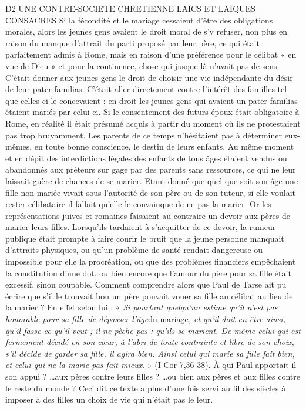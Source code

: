 D2 UNE CONTRE-SOCIETE CHRETIENNE
LAÏCS ET LAÏQUES CONSACRES
 Si la fécondité et le mariage cessaient d'être des obligations morales, alors les jeunes gens avaient le droit moral de s'y refuser, non plus en raison du manque d'attrait du parti proposé par leur père, ce qui était parfaitement admis à Rome, mais en raison d'une préférence pour le célibat « en vue de Dieu » et pour la continence, chose qui jusque là n'avait pas de sens. C'était donner aux jeunes gens le droit de choisir une vie indépendante du désir de leur pater familias. C'était aller directement contre l'intérêt des familles tel que celles-ci le concevaient : en droit les jeunes gens qui avaient un pater familias étaient mariés par celui-ci. 
 Si le consentement des futurs époux était obligatoire à Rome, en réalité il était présumé acquis à partir du moment où ils ne protestaient pas trop bruyamment. Les parents de ce temps n'hésitaient pas à déterminer eux-mêmes, en toute bonne conscience, le destin de leurs enfants. Au même moment et en dépit des interdictions légales des enfants de tous âges étaient vendus ou abandonnés aux prêteurs sur gage par des parents sans ressources, ce qui ne leur laissait guère de chances de se marier.
 Etant donné que quel que soit son âge une fille non mariée vivait sous l'autorité de son père ou de son tuteur, si elle voulait rester célibataire il fallait qu'elle le convainque de ne pas la marier. Or les représentations juives et romaines faisaient au contraire un devoir aux pères de marier leurs filles. Lorsqu'ils tardaient à s'acquitter de ce devoir, la rumeur publique était prompte à faire courir le bruit que la jeune personne manquait d'attraits physiques, ou qu'un problème de santé rendait dangereuse ou impossible pour elle la procréation, ou que des problèmes financiers empêchaient la constitution d'une dot, ou bien encore que l'amour du père pour sa fille était excessif, sinon coupable. 
 Comment comprendre alors que Paul de Tarse ait pu écrire que s'il le trouvait bon un père pouvait vouer sa fille au célibat au lieu de la marier ? En effet selon lui : « \emph{Si pourtant quelqu'un estime qu'il n'est pas honorable pour sa fille de dépasser l'âge}{du mariage}\emph{, et qu'il doit en être ainsi, qu'il fasse ce qu'il veut ; il ne pèche pas : qu'ils se marient. De même celui qui est fermement décidé en son cœur, à l'abri de toute contrainte et libre de son choix, s'il décide de garder sa fille, il agira bien. Ainsi celui qui marie sa fille fait bien, et celui qui ne la marie pas fait mieux}. » (I Cor 7,36-38). À qui Paul apportait-il son appui ? …aux pères contre leurs filles ? …ou bien aux pères et aux filles contre le reste du monde ? Ceci dit ce texte a plus d'une fois servi au fil des siècles à imposer à des filles un choix de vie qui n'était pas le leur. 
